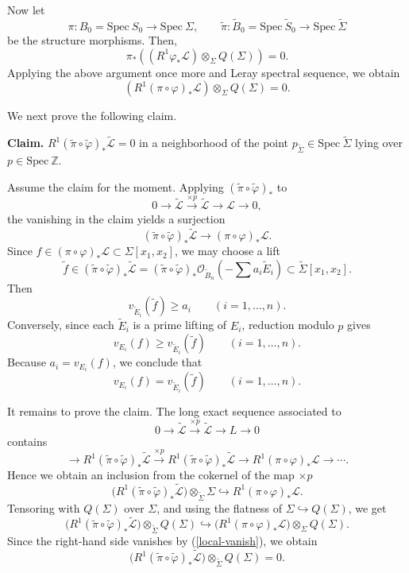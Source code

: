 \documentclass[a4paper]{amsart}
\newcommand{\oo}{{\mathcal O}}
\newcommand{\spec}{{\mathrm{Spec \ }}}
\newcommand{\we}{{\widetilde E}}
\newcommand{\wB}{{\widetilde{B}}}
\newcommand{\wv}{{\widetilde{\varphi}}}
\renewcommand{\L}{{\mathcal{L}}}
\newcommand{\wL}{{\widetilde{\L}}}
\theoremstyle{definition}
\begin{document}
Now let
\[
\pi : B_0=\spec S_0 \to \spec \Sigma,
\qquad
\widetilde{\pi} : \widetilde{B}_0=\spec \widetilde{S}_0 \to \spec \widetilde{\Sigma}
\]
be the structure morphisms. 
Then, 
$$
\pi_*((R^1\varphi_*\L)\otimes_{\Sigma} Q(\Sigma))=0.
$$
Applying the above argument once more and Leray spectral sequence,  we obtain
\begin{equation}\label{local-vanish}
(R^1(\pi \circ \varphi)_*\L)\otimes_{\Sigma} Q(\Sigma)=0.
\end{equation}

We next prove the following claim.

\medskip
\noindent
{\bf Claim.}
\(R^1(\widetilde{\pi}\circ\wv)_*\wL=0\) in a neighborhood of the point
\(p_{\widetilde{\Sigma}} \in \spec \widetilde{\Sigma}\) lying over \(p \in \spec \mathbb{Z}\).

\medskip
\noindent
Assume the claim for the moment. Applying \((\widetilde{\pi}\circ\wv)_*\) to
\[
0 \to \wL \xrightarrow{\times p} \wL \to \L \to 0,
\]
the vanishing in the claim yields a surjection
\[
(\widetilde{\pi}\circ\wv)_*\wL
\longrightarrow
(\pi\circ\varphi)_*\L.
\]
Since \(f \in (\pi\circ\varphi)_*\L \subset \Sigma[x_1,x_2]\), we may choose a lift
\[
\widetilde{f} \in (\widetilde{\pi}\circ\wv)_*\wL=(\widetilde{\pi}\circ\wv)_*\oo_{\wB_n}\left(-\sum a_i\we_i\right)
\subset \widetilde{\Sigma}[x_1,x_2].
\]
Then
\[
v_{\we_i}(\widetilde{f}) \ge a_i
\qquad (i=1,\dots,n).
\]
Conversely, since each \(\we_i\) is a prime lifting of \(E_i\), reduction
modulo \(p\) gives
\[
v_{E_i}(f) \ge v_{\we_i}(\widetilde{f})
\qquad (i=1,\dots,n).
\]
Because \(a_i=v_{E_i}(f)\), we conclude that
\[
v_{E_i}(f)=v_{\we_i}(\widetilde{f})
\qquad (i=1,\dots,n).
\]

It remains to prove the claim. The long exact sequence associated to
\[
0 \to \wL \xrightarrow{\times p} \wL \to L \to 0
\]
contains
\[
\to R^1(\widetilde{\pi}\circ\wv)_*\wL
\xrightarrow{\times p}
R^1(\widetilde{\pi}\circ\wv)_*\wL
\to R^1(\pi\circ\varphi)_*\L \to \cdots .
\]
Hence we obtain an inclusion from the cokernel of the map  $\times p$
\[
\bigl(R^1(\widetilde{\pi}\circ\wv)_*\wL\bigr)
\otimes_{\widetilde{\Sigma}} \Sigma
\hookrightarrow
R^1(\pi\circ\varphi)_*\L.
\]
Tensoring with \(Q(\Sigma)\) over \(\Sigma\), and using the flatness of
\(\Sigma \hookrightarrow Q(\Sigma)\), we get
\[
\bigl(R^1(\widetilde{\pi}\circ\wv)_*\wL\bigr)
\otimes_{\widetilde{\Sigma}} Q(\Sigma)
\hookrightarrow
\bigl(R^1(\pi\circ\varphi)_*\L\bigr)\otimes_{\Sigma} Q(\Sigma).
\]
Since the right-hand side vanishes by (\ref{local-vanish}), we obtain
\[
\bigl(R^1(\widetilde{\pi}\circ\wv)_*\wL\bigr)
\otimes_{\widetilde{\Sigma}} Q(\Sigma)=0.
\]
\end{document}
